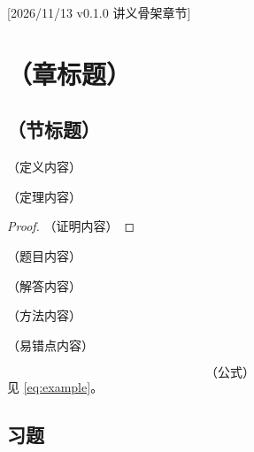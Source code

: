 %
[2026/11/13 v0.1.0 讲义骨架章节]
\chapter{（章标题）}
\section{（节标题）}
\begin{definition}[定义名称]
（定义内容）
\end{definition}
\begin{theorem}[定理名称]
（定理内容）
\begin{proof}
（证明内容）
\end{proof}
\end{theorem}
\begin{example}[title={例题名称}]
（题目内容）
\begin{solution}
（解答内容）
\end{solution}
\end{example}
\begin{method}[方法名称]
（方法内容）
\end{method}
\begin{pitfall}[易错点名称]
（易错点内容）
\end{pitfall}
\begin{equation}\label{eq:example}
  \text{（公式）}
\end{equation}
见 \cref{eq:example}。
\section{习题}

